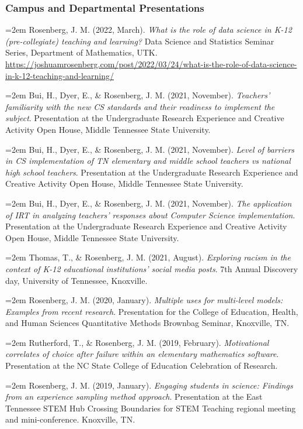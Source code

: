 \documentclass[
  14,
]{article}
\begin{document}
\hypertarget{campus-and-departmental-presentations}{%
\subsubsection{Campus and Departmental
Presentations}\label{campus-and-departmental-presentations}}

\hangindent=2em Rosenberg, J. M. (2022, March). \emph{What is the role
of data science in K-12 (pre-collegiate) teaching and learning?} Data
Science and Statistics Seminar Series, Department of Mathematics, UTK.
\url{https://joshuamrosenberg.com/post/2022/03/24/what-is-the-role-of-data-science-in-k-12-teaching-and-learning/}

\hangindent=2em Bui, H., Dyer, E., \& Rosenberg, J. M. (2021, November).
\emph{Teachers' familiarity with the new CS standards and their
readiness to implement the subject}. Presentation at the Undergraduate
Research Experience and Creative Activity Open House, Middle Tennessee
State University.

\hangindent=2em Bui, H., Dyer, E., \& Rosenberg, J. M. (2021, November).
\emph{Level of barriers in CS implementation of TN elementary and middle
school teachers vs national high school teachers}. Presentation at the
Undergraduate Research Experience and Creative Activity Open House,
Middle Tennessee State University.

\hangindent=2em Bui, H., Dyer, E., \& Rosenberg, J. M. (2021, November).
\emph{The application of IRT in analyzing teachers' responses about
Computer Science implementation}. Presentation at the Undergraduate
Research Experience and Creative Activity Open House, Middle Tennessee
State University.

\hangindent=2em Thomas, T., \& Rosenberg, J. M. (2021, August).
\emph{Exploring racism in the context of K-12 educational institutions'
social media posts}. 7th Annual Discovery day, University of Tennessee,
Knoxville.

\hangindent=2em Rosenberg, J. M. (2020, January). \emph{Multiple uses
for multi-level models: Examples from recent research}. Presentation for
the College of Education, Health, and Human Sciences Quantitative
Methods Brownbag Seminar, Knoxville, TN.

\hangindent=2em Rutherford, T., \& Rosenberg, J. M. (2019, February).
\emph{Motivational correlates of choice after failure within an
elementary mathematics software}. Presentation at the NC State College
of Education Celebration of Research.

\hangindent=2em Rosenberg, J. M. (2019, January). \emph{Engaging
students in science: Findings from an experience sampling method
approach}. Presentation at the East Tennessee STEM Hub Crossing
Boundaries for STEM Teaching regional meeting and mini-conference.
Knoxville, TN.
\end{document}
